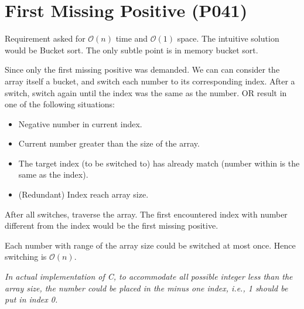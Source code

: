 \documentclass[varwidth]{standalone}
\begin{document}
\section{First Missing Positive (P041)}

Requirement asked for $\mathcal{O}(n)$ time and $\mathcal{O}(1)$ space. The
intuitive solution would be Bucket sort. The only subtle point is in memory
bucket sort.

Since only the first missing positive was demanded. We can can consider the
array itself a bucket, and switch each number to its corresponding index. After
a switch, switch again until the index was the same as the number. OR result in
one of the following situations:

\begin{itemize}
    \item Negative number in current index.
    \item Current number greater than the size of the array.
    \item The target index (to be switched to) has already match (number within
        is the same as the index).
    \item (Redundant) Index reach array size.
\end{itemize}

After all switches, traverse the array. The first encountered index with number
different from the index would be the first missing positive.

Each number with range of the array size could be switched at most once. Hence
switching is $\mathcal{O}(n)$.

\emph{In actual implementation of C, to accommodate all possible integer less
than the array size, the number could be placed in the minus one index, i.e., 1
should be put in index 0.}
\end{document}
